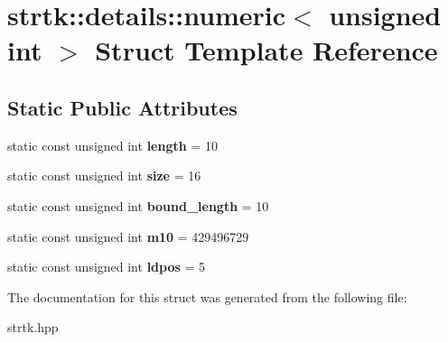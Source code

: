 \hypertarget{structstrtk_1_1details_1_1numeric_3_01unsigned_01int_01_4}{\section{strtk\-:\-:details\-:\-:numeric$<$ unsigned int $>$ Struct Template Reference}
\label{structstrtk_1_1details_1_1numeric_3_01unsigned_01int_01_4}
}
\subsection*{Static Public Attributes}
\begin{DoxyCompactItemize}
\item 
\hypertarget{structstrtk_1_1details_1_1numeric_3_01unsigned_01int_01_4_a2e9bd0b0586389acc357e43d8f6d0876}{static const unsigned int {\bfseries length} = 10}\label{structstrtk_1_1details_1_1numeric_3_01unsigned_01int_01_4_a2e9bd0b0586389acc357e43d8f6d0876}

\item 
\hypertarget{structstrtk_1_1details_1_1numeric_3_01unsigned_01int_01_4_a367bf8c82fea4f6548ca1d915524e72c}{static const unsigned int {\bfseries size} = 16}\label{structstrtk_1_1details_1_1numeric_3_01unsigned_01int_01_4_a367bf8c82fea4f6548ca1d915524e72c}

\item 
\hypertarget{structstrtk_1_1details_1_1numeric_3_01unsigned_01int_01_4_a8cd26f56dbb868ff978908189ca4c86e}{static const unsigned int {\bfseries bound\-\_\-length} = 10}\label{structstrtk_1_1details_1_1numeric_3_01unsigned_01int_01_4_a8cd26f56dbb868ff978908189ca4c86e}

\item 
\hypertarget{structstrtk_1_1details_1_1numeric_3_01unsigned_01int_01_4_aa62653ee6af3a2bcc8f1a595acdbd132}{static const unsigned int {\bfseries m10} = 429496729}\label{structstrtk_1_1details_1_1numeric_3_01unsigned_01int_01_4_aa62653ee6af3a2bcc8f1a595acdbd132}

\item 
\hypertarget{structstrtk_1_1details_1_1numeric_3_01unsigned_01int_01_4_ad9def3fe9a4b64d11831f990e02e601b}{static const unsigned int {\bfseries ldpos} = 5}\label{structstrtk_1_1details_1_1numeric_3_01unsigned_01int_01_4_ad9def3fe9a4b64d11831f990e02e601b}

\end{DoxyCompactItemize}


The documentation for this struct was generated from the following file\-:\begin{DoxyCompactItemize}
\item 
strtk.\-hpp\end{DoxyCompactItemize}
